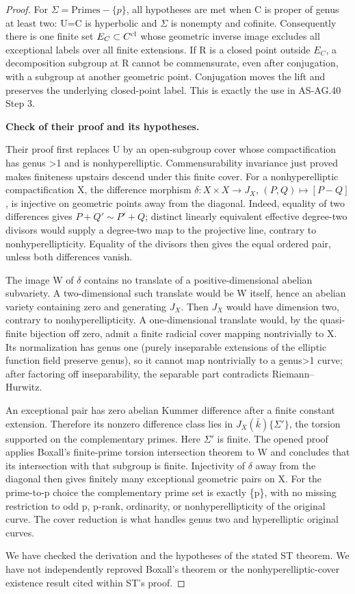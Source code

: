 \documentclass[11pt,a4paper]{article}
\begin{document}
\begin{proof}
For \({\Sigma}=\mathrm{Primes}-\{p\}\), all hypotheses are met when C is proper of genus at least two: U=C is hyperbolic and \({\Sigma}\) is nonempty and cofinite. Consequently there is one finite set \(E_C\subset C^{\rm cl}\) whose geometric inverse image excludes all exceptional labels over all finite extensions. If R is a closed point outside \(E_C\), a decomposition subgroup at R cannot be commensurate, even after conjugation, with a subgroup at another geometric point. Conjugation moves the lift and preserves the underlying closed-point label. This is exactly the use in AS-AG.40 Step 3.

\textbf{Check of their proof and its hypotheses.}

Their proof first replaces U by an open-subgroup cover whose compactification has genus \textgreater1 and is nonhyperelliptic. Commensurability invariance just proved makes finiteness upstairs descend under this finite cover. For a nonhyperelliptic compactification X, the difference morphism \(\delta:X\times X\to J_X\), \((P,Q)\mapsto[P-Q]\), is injective on geometric points away from the diagonal. Indeed, equality of two differences gives \(P+Q'\sim P'+Q\); distinct linearly equivalent effective degree-two divisors would supply a degree-two map to the projective line, contrary to nonhyperellipticity. Equality of the divisors then gives the equal ordered pair, unless both differences vanish.

The image W of \({\delta}\) contains no translate of a positive-dimensional abelian subvariety. A two-dimensional such translate would be W itself, hence an abelian variety containing zero and generating \(J_X\). Then \(J_X\) would have dimension two, contrary to nonhyperellipticity. A one-dimensional translate would, by the quasi-finite bijection off zero, admit a finite radicial cover mapping nontrivially to X. Its normalization has genus one (purely inseparable extensions of the elliptic function field preserve genus), so it cannot map nontrivially to a genus\textgreater1 curve; after factoring off inseparability, the separable part contradicts Riemann--Hurwitz.

An exceptional pair has zero abelian Kummer difference after a finite constant extension. Therefore its nonzero difference class lies in \(J_X(\bar k)\{\Sigma'\}\), the torsion supported on the complementary primes. Here \({\Sigma}'\) is finite. The opened proof applies Boxall's finite-prime torsion intersection theorem to W and concludes that its intersection with that subgroup is finite. Injectivity of \({\delta}\) away from the diagonal then gives finitely many exceptional geometric pairs on X. For the prime-to-p choice the complementary prime set is exactly \{p\}, with no missing restriction to odd p, p-rank, ordinarity, or nonhyperellipticity of the original curve. The cover reduction is what handles genus two and hyperelliptic original curves.

We have checked the derivation and the hypotheses of the stated ST theorem. We have not independently reproved Boxall's theorem or the nonhyperelliptic-cover existence result cited within ST's proof.


\end{proof}
\end{document}

